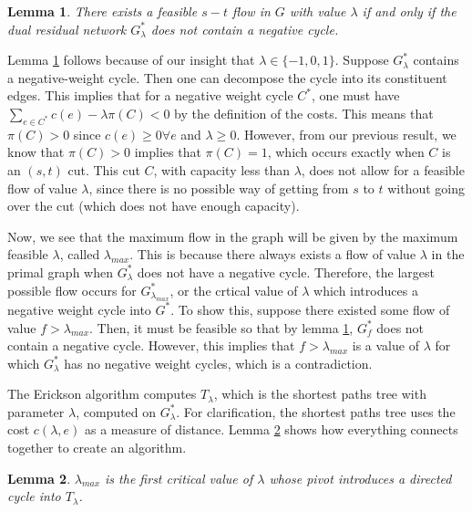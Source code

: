 \documentclass[12pt]{article}
\newtheorem{lemma}{Lemma}
\begin{document}
\begin{lemma}
There exists a feasible $s-t$ flow in $G$ with value $\lambda$ if and only if the dual residual network $G^*_\lambda$ does not contain a negative cycle. 
\label{lem:resid-network}
\end{lemma}

Lemma \ref{lem:resid-network} follows because of our insight that $\lambda \in \{-1,0,1\}$. Suppose $G^*_\lambda$ contains a negative-weight cycle. Then one can decompose the cycle into its constituent edges. This implies that for a negative weight cycle $C^*$, one must have $\sum_{e \in C^*} c(e) - \lambda \pi(C) < 0$ by the definition of the costs. This means that $\pi(C) > 0$ since $c(e) \geq 0 \forall e$ and $\lambda \geq 0$. However, from our previous result, we know that $\pi(C) > 0$ implies that $\pi(C) = 1$, which occurs exactly when $C$ is an $(s,t)$ cut. This cut $C$, with capacity less than $\lambda$, does not allow for a feasible flow of value $\lambda$, since there is no possible way of getting from $s$ to $t$ without going over the cut (which does not have enough capacity). 

Now, we see that the maximum flow in the graph will be given by the maximum feasible $\lambda$, called $\lambda_{max}$. This is because there always exists a flow of value $\lambda$ in the primal graph when $G^*_\lambda$ does not have a negative cycle. Therefore, the largest possible flow occurs for $G^*_{\lambda_{max}}$, or the crtical value of $\lambda$ which introduces a negative weight cycle into $G^*$. To show this, suppose there existed some flow of value $f > \lambda_{max}$. Then, it must be feasible so that by lemma \ref{lem:resid-network}, $G^*_f$ does not contain a negative cycle. However, this implies that $f > \lambda_{max}$ is a value of $\lambda$ for which $G^*_\lambda$ has no negative weight cycles, which is a contradiction.

The Erickson algorithm computes $T_\lambda$, which is the shortest paths tree with parameter $\lambda$, computed on $G^*_\lambda$. For clarification, the shortest paths tree uses the cost $c(\lambda, e)$ as a measure of distance. Lemma \ref{lem:directed-cycle} shows how everything connects together to create an algorithm.  

\begin{lemma}
$\lambda_{max}$ is the first critical value of $\lambda$ whose pivot introduces a directed cycle into $T_{\lambda}$. 
\label{lem:directed-cycle}
\end{lemma}
\end{document}
